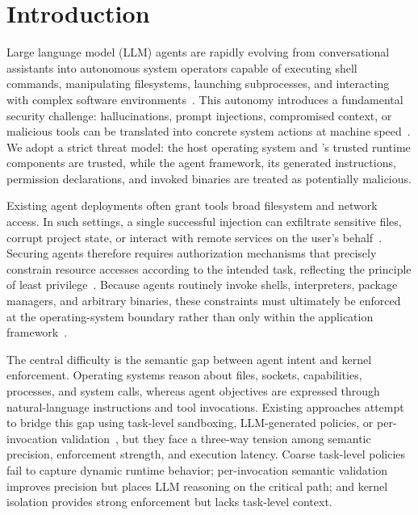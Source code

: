 \section{Introduction}

Large language model (LLM) agents are rapidly evolving from conversational
assistants into autonomous system operators capable of executing shell commands,
manipulating filesystems, launching subprocesses, and interacting with complex
software environments~\cite{yao2022react,schick2023toolformer,yang2024sweagent}.
This autonomy introduces a fundamental security
challenge: hallucinations, prompt injections, compromised context, or malicious
tools can be translated into concrete system actions at machine
speed~\cite{greshake2023indirect,debenedetti2024agentdojo}. We adopt a strict
threat model: the host operating system and \SystemName's trusted runtime
components are trusted, while the agent framework, its generated instructions,
permission declarations, and invoked binaries are treated as potentially
malicious.

Existing agent deployments often grant tools broad filesystem and network
access. In such settings, a single successful injection can exfiltrate sensitive
files, corrupt project state, or interact with remote services on the user's
behalf~\cite{greshake2023indirect,debenedetti2024agentdojo,debenedetti2025camel}.
Securing agents therefore requires authorization mechanisms that precisely
constrain resource accesses according to the intended task, reflecting the
principle of least privilege~\cite{saltzer1975protection}. Because agents
routinely invoke shells, interpreters, package managers, and arbitrary binaries,
these constraints must ultimately be enforced at the operating-system boundary
rather than only within the application framework~\cite{watson2010capsicum,wright2002lsm}.

The central difficulty is the semantic gap between agent intent and kernel
enforcement. Operating systems reason about files, sockets, capabilities,
processes, and system calls, whereas agent objectives are expressed through
natural-language instructions and tool invocations. Existing approaches attempt
to bridge this gap using task-level sandboxing, LLM-generated policies, or
per-invocation validation~\cite{debenedetti2025camel,xiang2024guardagent}, but
they face a three-way tension among semantic precision, enforcement strength,
and execution latency. Coarse task-level policies fail to capture dynamic
runtime behavior; per-invocation semantic validation improves precision but
places LLM reasoning on the critical path; and kernel isolation provides strong
enforcement but lacks task-level context.

